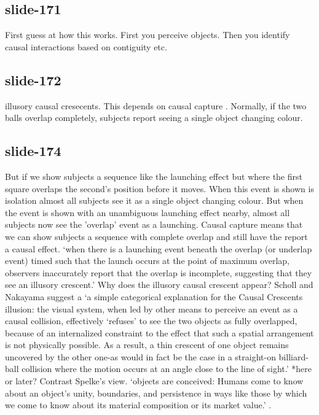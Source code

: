 \documentclass[12pt,\papersize]{extarticle}
\begin{document}
 
\subsection{slide-171}
First guess at how this works. First you perceive objects. Then you identify causal interactions based on contiguity etc.
 
 
\subsection{slide-172}
illusory causal cresecents.
This depends on causal capture \citep{Scholl:2002eb}.
Normally, if the two balls overlap completely, subjects report seeing a single object changing colour.
 
 
\subsection{slide-174}
But if we show subjects a sequence like the launching effect but where the first square overlaps the second's position before it moves. When this event is shown is isolation almost all subjects see it as a single object changing colour. But when the event is shown with an unambiguous launching effect nearby, almost all subjects now see the 'overlap' event as a launching.
Causal capture means that we can show subjects a sequence with complete overlap and still have the report a causal effect.
‘when there is a launching event beneath the overlap (or underlap event) timed such that the launch occurs at the point of maximum overlap, observers inaccurately report that the overlap is incomplete, suggesting that they see an illusory crescent.’
\citep[p.\ 461]{Scholl:2004dx}
Why does the illusory causal crescent appear? Scholl and Nakayama suggest a
‘a simple categorical explanation for the Causal Crescents illusion: the visual system, when led by other means to perceive an event as a causal collision, effectively ‘refuses’ to see the two objects as fully overlapped, because of an internalized constraint to the effect that such a spatial arrangement is not physically possible. As a result, a thin crescent of one object remains uncovered by the other one-as would in fact be the case in a straight-on billiard-ball collision where the motion occurs at an angle close to the line of sight.’
\citep[p.\ 466]{Scholl:2004dx}
*here or later?
Contrast Spelke’s view.
‘objects are conceived: Humans come to know about an object’s unity, boundaries, and persistence in ways like those by which we come to know about its material composition or its market value.’
\citep[p.\ 198]{Spelke:1988xc}.
 
\end{document}
